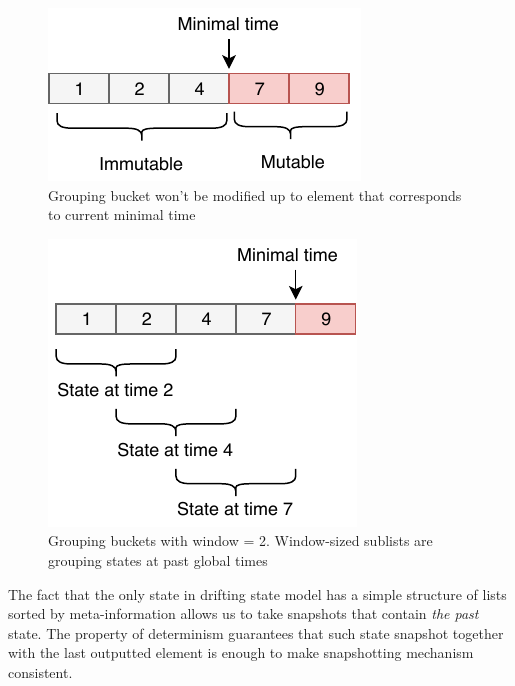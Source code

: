 \begin{figure}[htbp]
  \centering
  \includegraphics[width=.3\textwidth]{pics/immutable}
  \caption{Grouping bucket won't be modified up to element that corresponds to current minimal time}
  \label {immutable}
\end{figure}

\begin{figure}[htbp]
  \centering
  \includegraphics[width=.3\textwidth]{pics/substate}
  \caption{Grouping buckets with window = 2. Window-sized sublists are grouping states at past global times}
  \label {substate}
\end{figure}

The fact that the only state in drifting state model has a simple structure of lists sorted by meta-information allows us to take snapshots that contain {\em the past} state. The property of determinism guarantees that such state snapshot together with the last outputted element is enough to make snapshotting mechanism consistent. 



